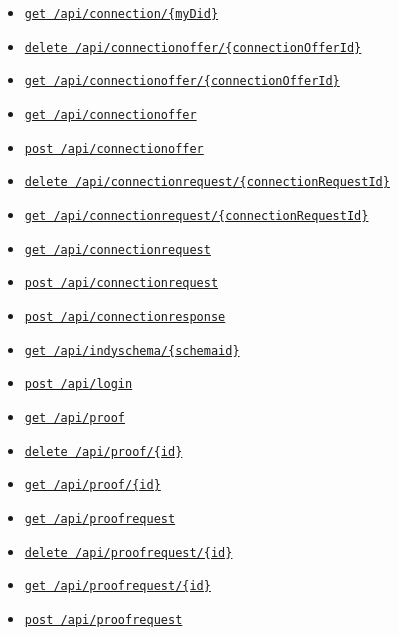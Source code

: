 \begin{itemize}
\tightlist
\item
  \protect\hyperlink{apiConnectionMyDidGet}{\texttt{get\ /api/connection/\{myDid\}}}
\item
  \protect\hyperlink{apiConnectionofferConnectionOfferIdDelete}{\texttt{delete\ /api/connectionoffer/\{connectionOfferId\}}}
\item
  \protect\hyperlink{apiConnectionofferConnectionOfferIdGet}{\texttt{get\ /api/connectionoffer/\{connectionOfferId\}}}
\item
  \protect\hyperlink{apiConnectionofferGet}{\texttt{get\ /api/connectionoffer}}
\item
  \protect\hyperlink{apiConnectionofferPost}{\texttt{post\ /api/connectionoffer}}
\item
  \protect\hyperlink{apiConnectionrequestConnectionRequestIdDelete}{\texttt{delete\ /api/connectionrequest/\{connectionRequestId\}}}
\item
  \protect\hyperlink{apiConnectionrequestConnectionRequestIdGet}{\texttt{get\ /api/connectionrequest/\{connectionRequestId\}}}
\item
  \protect\hyperlink{apiConnectionrequestGet}{\texttt{get\ /api/connectionrequest}}
\item
  \protect\hyperlink{apiConnectionrequestPost}{\texttt{post\ /api/connectionrequest}}
\item
  \protect\hyperlink{apiConnectionresponsePost}{\texttt{post\ /api/connectionresponse}}
\item
  \protect\hyperlink{apiIndyschemaSchemaidGet}{\texttt{get\ /api/indyschema/\{schemaid\}}}
\item
  \protect\hyperlink{apiLoginPost}{\texttt{post\ /api/login}}
\item
  \protect\hyperlink{apiProofGet}{\texttt{get\ /api/proof}}
\item
  \protect\hyperlink{apiProofIdDelete}{\texttt{delete\ /api/proof/\{id\}}}
\item
  \protect\hyperlink{apiProofIdGet}{\texttt{get\ /api/proof/\{id\}}}
\item
  \protect\hyperlink{apiProofrequestGet}{\texttt{get\ /api/proofrequest}}
\item
  \protect\hyperlink{apiProofrequestIdDelete}{\texttt{delete\ /api/proofrequest/\{id\}}}
\item
  \protect\hyperlink{apiProofrequestIdGet}{\texttt{get\ /api/proofrequest/\{id\}}}
\item
  \protect\hyperlink{apiProofrequestPost}{\texttt{post\ /api/proofrequest}}

\end{itemize}
